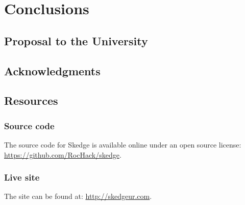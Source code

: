 
\chapter{Conclusions}

\section{Proposal to the University}

\section{Acknowledgments}

\section{Resources}

\subsection*{Source code}

The source code for Skedge is available online under an open source license:\\
\url{https://github.com/RocHack/skedge}.

\subsection*{Live site}

\noindent The site can be found at: \url{http://skedgeur.com}.